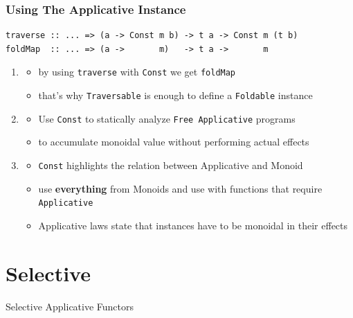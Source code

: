 \documentclass[aspectratio=169]{beamer}
\begin{document}
\begin{frame}[fragile,t]
  \frametitle{Using The Applicative Instance}
  \begin{verbatim}
traverse :: ... => (a -> Const m b) -> t a -> Const m (t b)
foldMap  :: ... => (a ->       m)   -> t a ->       m
  \end{verbatim}
\vfill
  \begin{enumerate}
  \item
    \begin{itemize}
    \item by using \texttt{traverse} with \texttt{Const} we get \texttt{foldMap}
    \item that's why \texttt{Traversable} is enough to define a \texttt{Foldable} instance
    \end{itemize}
  \item<2->
    \begin{itemize}
    \item Use \texttt{Const} to statically analyze \texttt{Free Applicative} programs
    \item to accumulate monoidal value without performing actual effects
    \end{itemize}
  \item<3->
    \begin{itemize}
    \item \texttt{Const} highlights the relation between
      Applicative and Monoid
    \item use \textbf{everything} from Monoids and use with functions that require \texttt{Applicative}
    \item Applicative laws state that instances have to be monoidal in their effects
    \end{itemize}
  \end{enumerate}
\end{frame}

\section{Selective}
\begin{frame}
  \begin{center}
    \Huge Selective Applicative Functors
  \end{center}
\end{frame}
\end{document}
